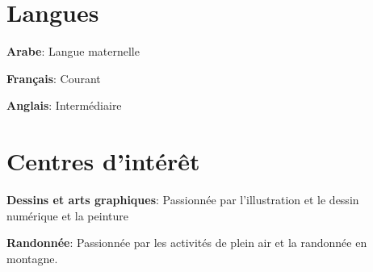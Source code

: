 \documentclass[a4paper,11pt]{article}
\begin{document}
\section{Langues}
 \begin{itemize}[leftmargin=0.5cm, label={}]
    \small{
     \item \textbf{Arabe}: Langue maternelle \\
     \item \textbf{Français}: Courant \\
     \item \textbf{Anglais}: Intermédiaire \\
    }
 \end{itemize}

\section{Centres d'intérêt}
 \begin{itemize}[leftmargin=0.5cm, label={}]
    \small{
     \item \textbf{Dessins et arts graphiques}: Passionnée par l'illustration et le dessin numérique et la peinture \\
    \item \textbf{Randonnée}: Passionnée par les activités de plein air et la randonnée en montagne. \\

    }
 \end{itemize}
\end{document}
